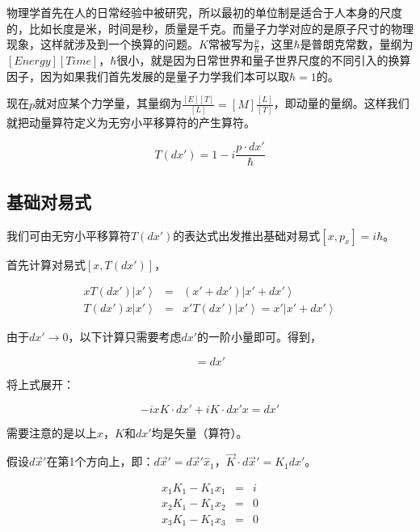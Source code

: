 物理学首先在人的日常经验中被研究，所以最初的单位制是适合于人本身的尺度的，比如长度是米，时间是秒，质量是千克。而量子力学对应的是原子尺寸的物理现象，这样就涉及到一个换算的问题。$K$常被写为$\frac{p}{\hbar}$，这里$\hbar$是普朗克常数，量纲为$[Energy] [Time]$，$\hbar$很小，就是因为日常世界和量子世界尺度的不同引入的换算因子，因为如果我们首先发展的是量子力学我们本可以取$\hbar = 1$的。

现在$p$就对应某个力学量，其量纲为$\frac{[E] [T]}{[L]} = [M] \frac{[L]}{[T]}$，即动量的量纲。这样我们就把动量算符定义为无穷小平移算符的产生算符。

\begin{equation}
T(dx') = 1 - i \frac{p \cdot dx'}{ \hbar }
\end{equation}

\subsection{基础对易式}

我们可由无穷小平移算符$T(dx')$的表达式出发推出基础对易式$[x, p_x] = i \hbar$。

首先计算对易式$[x, T(dx')]$，

\begin{eqnarray*}
x T (dx') \left| x' \right\rangle & = & (x' + dx' ) \left| x'+ dx' \right\rangle \\
T(dx' ) x \left| x' \right\rangle & = & x' T(dx') \left| x' \right\rangle = x' \left| x' + dx' \right\rangle
\end{eqnarray*}

由于$dx' \to 0$，以下计算只需要考虑$dx'$的一阶小量即可。得到，

\begin{equation}
[x, T(dx')] = dx'
\end{equation}

将上式展开：

\begin{equation}
- i x K \cdot dx' + i K \cdot dx' x = dx'
\end{equation}

需要注意的是以上$x$，$K$和$dx'$均是矢量（算符）。

假设$d \vec x'$在第1个方向上，即：$d \vec x' = d \vec x' \hat x_1 $，$\vec K \cdot d \vec x' = K_1 dx'$。

\begin{eqnarray*}
x_1 K_1 - K_1 x_1 & = & i \\
x_2 K_1 - K_1 x_2 & = & 0 \\
x_3 K_1 - K_1 x_3 & = & 0
\end{eqnarray*}

